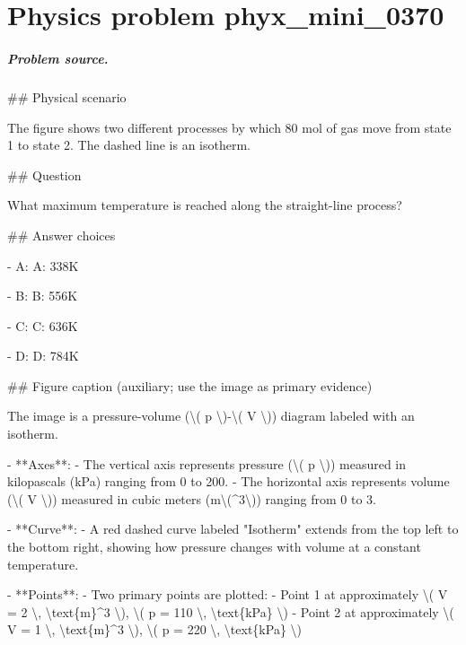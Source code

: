 
\chapter{Physics problem phyx\_mini\_0370}
\label{ch:PhyXMiniProblems_problem_phyx_mini_0370}

\paragraph{Problem source.}
\#\# Physical scenario

The figure shows two different processes by which 80 mol of gas move from state 1 to state 2. The dashed line is an isotherm.

\#\# Question

What maximum temperature is reached along the straight-line process?

\#\# Answer choices

- A: A: 338K

- B: B: 556K

- C: C: 636K

- D: D: 784K

\#\# Figure caption (auxiliary; use the image as primary evidence)

The image is a pressure-volume (\textbackslash{}( p \textbackslash{})-\textbackslash{}( V \textbackslash{})) diagram labeled with an isotherm. 

- **Axes**: 
  - The vertical axis represents pressure (\textbackslash{}( p \textbackslash{})) measured in kilopascals (kPa) ranging from 0 to 200.
  - The horizontal axis represents volume (\textbackslash{}( V \textbackslash{})) measured in cubic meters (m\textbackslash{}(\textasciicircum{}3\textbackslash{})) ranging from 0 to 3.

- **Curve**:
  - A red dashed curve labeled "Isotherm" extends from the top left to the bottom right, showing how pressure changes with volume at a constant temperature.

- **Points**:
  - Two primary points are plotted: 
    - Point 1 at approximately \textbackslash{}( V = 2 \textbackslash{}, \textbackslash{}text\{m\}\textasciicircum{}3 \textbackslash{}), \textbackslash{}( p = 110 \textbackslash{}, \textbackslash{}text\{kPa\} \textbackslash{})
    - Point 2 at approximately \textbackslash{}( V = 1 \textbackslash{}, \textbackslash{}text\{m\}\textasciicircum{}3 \textbackslash{}), \textbackslash{}( p = 220 \textbackslash{}, \textbackslash{}text\{kPa\} \textbackslash{})

